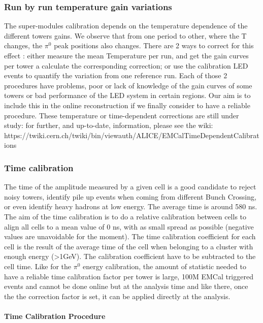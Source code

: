\subsubsection{Run by run temperature gain variations}

The super-modules calibration depends on the temperature dependence of the different towers gains. We observe that from one period to other, where the T changes, the $\pi^{0}$ peak positions also changes. There are 2 ways to correct for this effect : either measure the mean Temperature per run, and get the gain curves per tower a calculate the corresponding correction; or use the calibration LED events to quantify the variation from one reference run. Each of those 2 procedures have problems, poor or lack of knowledge of the gain curves of some towers or bad performance of the LED system in certain regions. Our aim is to include this in the online reconstruction if we finally consider to have a reliable procedure.
These temperature or time-dependent corrections are still under study: for further, and up-to-date, information, please see the wiki: 
https://twiki.cern.ch/twiki/bin/viewauth/ALICE/EMCalTimeDependentCalibrations


\subsubsection{Time calibration  }

The time of the amplitude measured by a given cell is a good candidate to reject noisy towers, identify pile up events when coming from different Bunch Crossing, or even identify heavy hadrons at low energy. The average time is around 580 ns. The aim of the time calibration is to do a relative calibration between cells to align all cells to a mean value of 0 ns, with as small spread as possible (negative values are unavoidable for the moment). The time calibration coefficient for each cell is the result of the average time of the cell when belonging to a cluster with enough energy (>1GeV). 
The calibration coefficient have to be subtracted to the cell time. Like for the $\pi^{0}$  energy calibration, the amount of statistic needed to have a reliable time calibration factor per tower is large, 100M EMCal triggered events and cannot be done online but at the analysis time and like there, once the the correction factor is set, it can be applied directly at the analysis.

\paragraph*{Time Calibration Procedure\\}

